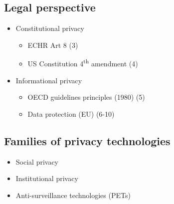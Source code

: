 \documentclass[../overview.tex]{subfiles}
\begin{document}
\subsection{Legal perspective}
\begin{itemize}
	\item Constitutional privacy
	\begin{itemize}
		\item ECHR Art 8 (3)
		\item US Constitution 4\textsuperscript{th} amendment (4)
	\end{itemize}

	\item Informational privacy
	\begin{itemize}
		\item OECD guidelines principles (1980) (5)
		\item Data protection (EU) (6-10)
	\end{itemize}
\end{itemize}

\subsection{Families of privacy technologies}
\begin{itemize}
	\item Social privacy
	\item Institutional privacy
	\item Anti-surveillance technologies (PETs)
\end{itemize}
\end{document}

